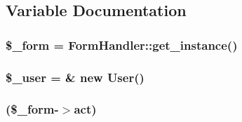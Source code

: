 \subsection{Variable Documentation}
\subsubsection[{\$\_\-form}]{\setlength{\rightskip}{0pt plus 5cm}\$\_\-form = FormHandler::get\_\-instance()}\label{index_8php_ab14b242803551e0f269742a7103f149d}
\subsubsection[{\$\_\-user}]{\setlength{\rightskip}{0pt plus 5cm}\$\_\-user = \& new {\bf User}()}\label{index_8php_a5df5982b9dadc74df05081972cd67fdf}
\subsubsection[{switch}]{(\$\_\-form-\/$>$act)}\label{index_8php_a52f05478bd75c12464168eb5bed6d57d}
